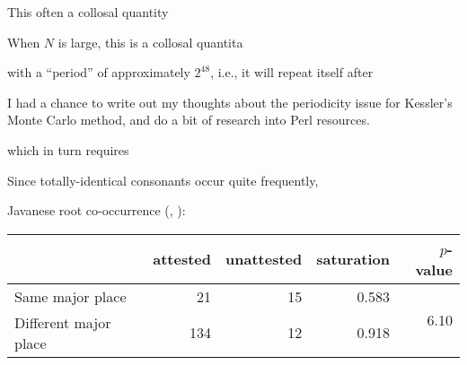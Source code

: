 This often a collosal quantity 

When $N$ is large, this is a collosal quantita


with a ``period'' of approximately $2 ^ 48$, i.e., it will repeat itself after 




I had a chance to write out my thoughts about the periodicity issue for Kessler's Monte Carlo method, and do a bit of research into Perl resources. 





 which in turn requires

Since totally-identical consonants occur quite frequently, 

\ex Javanese root co-occurrence (\citealp[][264]{Uhlenbeck1950}, \citealp[][139]{Mester1988}): \vspace{6pt} \\
\begin{tabular}{l r r r r}
\toprule
                      & attested & unattested & saturation & $p$-value \\
\midrule
Same major place      & 21       & 15         & 0.583      & \multirow{2}{*}{6.10\e{-06}} \\
Different major place & 134      & 12         & 0.918 \\
\bottomrule
\end{tabular}
\xe

